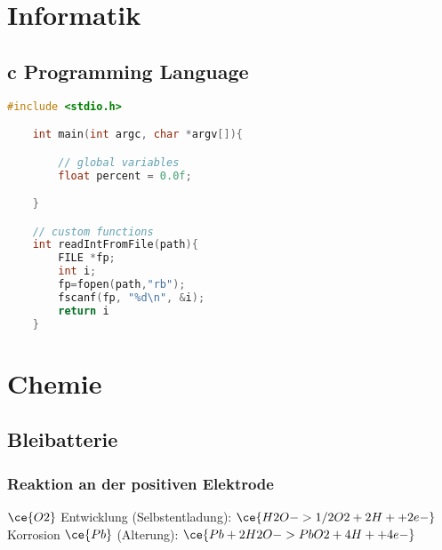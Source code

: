 \documentclass[english]{latex4ei/latex4ei_sheet}
\begin{document}
\section{Informatik}


\begin{sectionbox}
	\subsection{c Programming Language}
	\begin{lstlisting}[language=C, gobble=4]
	#include <stdio.h>

	int main(int argc, char *argv[]){

		// global variables
		float percent = 0.0f;

	}

	// custom functions
	int readIntFromFile(path){
		FILE *fp;
		int i;
		fp=fopen(path,"rb");
		fscanf(fp, "%d\n", &i);
		return i
	}
	\end{lstlisting}
\end{sectionbox}


\section{Chemie}

\begin{sectionbox}

	\subsection{Bleibatterie}

		\subsubsection{Reaktion an der positiven Elektrode}
		\begin{center}
		\end{center}
		$\ce{O2}$ Entwicklung (Selbstentladung): $\ce{H2O -> 1/2O2 + 2H+ +2e-}$\\
		Korrosion $\ce{Pb}$ (Alterung): $\ce{Pb + 2H2O -> PbO2 + 4H+ +4e-}$
\end{sectionbox}


\end{document}

